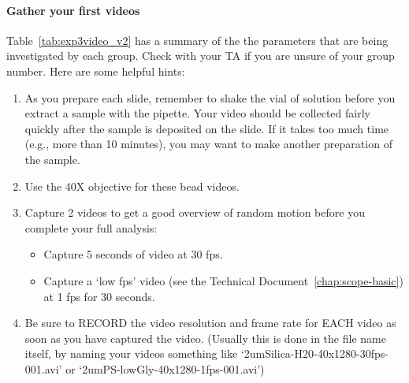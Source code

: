 \paragraph*{Gather your first videos} 
Table~\ref{tab:exp3video_v2} has a summary of the the parameters that are being investigated by each group.
Check with your TA if you are unsure of your group number.
Here are some helpful hints:
\begin{enumerate}
\item As you prepare each slide, remember to shake the vial of solution before you extract a sample with the pipette. Your video should be collected fairly quickly after the sample is deposited on the slide. If it takes too much time (e.g., more than 10 minutes), you may want to make another preparation of the sample.
\item Use the 40X objective for these bead videos.
\item Capture 2 videos to get a good overview of random motion before you complete your full analysis:
\begin{itemize}
	\item Capture 5 seconds of video at 30 fps.
	\item Capture a `low fps' video (see the Technical Document~\ref{chap:scope-basic}) at 1 fps for 30 seconds. 
\end{itemize}
\item Be sure to RECORD the video resolution and frame rate for EACH video as soon as you have captured the video. (Usually this is done in the file name itself, by naming your videos something like `2umSilica-H20-40x1280-30fps-001.avi' or `2umPS-lowGly-40x1280-1fps-001.avi')
\end{enumerate}
